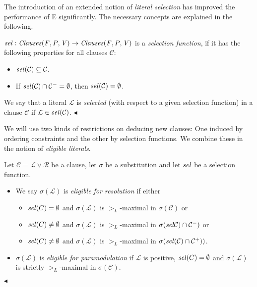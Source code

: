 \documentclass{article}
\begin{document}
The introduction of an extended notion of \emph{literal selection} has
improved the performance of E significantly. The necessary concepts
are explained in the following.

\begin{definition}
  \label{def:basics:inferences:selection}
  $\mathit{sel}:\mathit{Clauses(F,P,V)} \rightarrow \mathit{Clauses(F,P,V)}$ is a
  \emph{selection function}, if it has the following properties for
  all clauses $\mathcal{C}$:
    \begin{itemize}
    \item $\mathit{sel}(\mathcal{C}) \subseteq \mathcal{C}$.
    \item If $\mathit{sel}(\mathcal{C})\cap \mathcal{C^-} = \emptyset$, then
      $\mathit{sel}(\mathcal{C}) = \emptyset$.
    \end{itemize}
    We say that a literal $\mathcal{L}$ is \emph{selected} (with
    respect to a given selection function) in a clause $\mathcal{C}$
    if $\mathcal{L} \in \mathit{sel}(\mathcal{C})$.
  \hfill$\blacktriangleleft$
\end{definition}

We will use two kinds of restrictions on deducing new clauses: One
induced by ordering constraints and the other by selection functions.
We combine these in the notion of \emph{eligible literals}.

\begin{definition}
 \label{def:basics:inferences:eligible}
 Let $\mathcal{C} = \mathcal{L} \vee \mathcal{R}$ be a clause, let
 $\sigma$ be a substitution and let $\mathit{sel}$ be a selection
 function. 
 \begin{itemize}
 \item We say $\sigma(\mathcal{L})$ is \emph{eligible for
     resolution} if either
   \begin{itemize}
   \item $\mathit{sel}(C) = \emptyset$ and $\sigma(\mathcal{L})$ is
     $>_L$-maximal in $\sigma(\mathcal{C})$ or
   \item $\mathit{sel}(C) \not= \emptyset$ and $\sigma(\mathcal{L})$ is
     $>_L$-maximal in $\sigma(\mathit{sel}\mathcal{C})\cap \mathcal{C^-})$
     or
   \item $\mathit{sel}(C) \not= \emptyset$ and $\sigma(\mathcal{L})$ is
     $>_L$-maximal in $\sigma(\mathit{sel}(\mathcal{C})\cap
     \mathcal{C^+}))$.
   \end{itemize} 
 \item $\sigma(\mathcal{L})$ is \emph{eligible for paramodulation} if
   $\mathcal{L}$ is positive, $\mathit{sel}(C) = \emptyset$ and
   $\sigma(\mathcal{L})$ is strictly $>_L$-maximal in
   $\sigma(\mathcal{C})$.
 \end{itemize}
 \hfill$\blacktriangleleft$
\end{definition}
\end{document}
